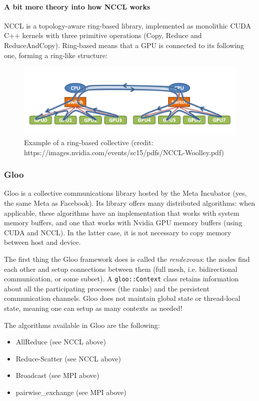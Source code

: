 \documentclass{article}
\begin{document}
\paragraph{A bit more theory into how NCCL works}
NCCL is a topology-aware ring-based library, implemented as monolithic CUDA C++ kernels with three primitive operations (Copy, Reduce and ReduceAndCopy). Ring-based means that a GPU is connected to its following one, forming a ring-like structure:

\begin{figure}[h!]
  \center
  \includegraphics[width=0.6\linewidth]{images/2022-09-07-15-37-09.png}
  \caption{Example of a ring-based collective (credit: https://images.nvidia.com/events/sc15/pdfs/NCCL-Woolley.pdf)}
\end{figure}
\FloatBarrier

\subsubsection{Gloo}
Gloo is a collective communications library hosted by the Meta Incubator (yes, the same Meta as Facebook). Its library offers many distributed algorithms: when applicable, these algorithms have an implementation that works with system memory buffers, and one that works with Nvidia GPU memory buffers (using CUDA and NCCL). In the latter case, it is not necessary to copy memory between host and device.

The first thing the Gloo framework does is called the \emph{rendezvous}: the nodes find each other and setup connections between them (full mesh, i.e. bidirectional communication, or some subset). A \lstinline{gloo::Context} class retains information about all the participating processes (the ranks) and the persistent communication channels. Gloo does not maintain global state or thread-local state, meaning one can setup as many contexts as needed!

The algorithms available in Gloo are the following:
\begin{itemize}
  \item AllReduce (see NCCL above)
  \item Reduce-Scatter (see NCCL above)
  \item Broadcast (see MPI above)
  \item pairwise\_exchange (see MPI above)
\end{itemize}
\end{document}
